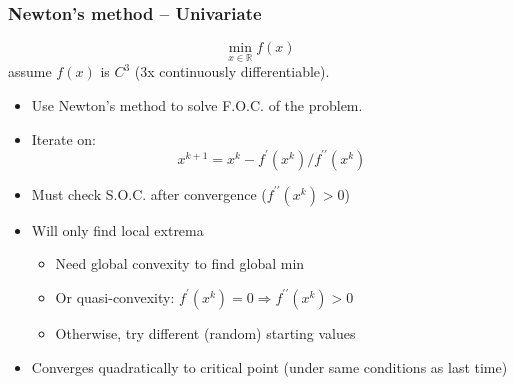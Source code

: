 \documentclass[bigger]{beamer}
\begin{document}
\begin{frame}%
\frametitle{Newton's method -- Univariate}

\begin{equation*}
\min_{x\in \mathbb{R}}f(x)
\end{equation*}%
assume $f(x)$ is $C^{3}$ (3x continuously differentiable).

\begin{itemize}
\item Use Newton's method to solve F.O.C. of the problem.

\item Iterate on:%
\begin{equation*}
x^{k+1}=x^{k}-f^{\prime }(x^{k})/f^{\prime \prime }(x^{k})
\end{equation*}

\item Must check S.O.C. after convergence ($f^{\prime \prime }(x^{k})>0$)

\item Will only find local extrema

\begin{itemize}
\item Need global convexity to find global min

\item Or quasi-convexity: $f^{\prime }(x^{k})=0\Rightarrow f^{\prime \prime
}(x^{k})>0$

\item Otherwise, try different (random) starting values
\end{itemize}

\item Converges quadratically to critical point (under same conditions as last time)
\end{itemize}

\end{frame}%
\end{document}
